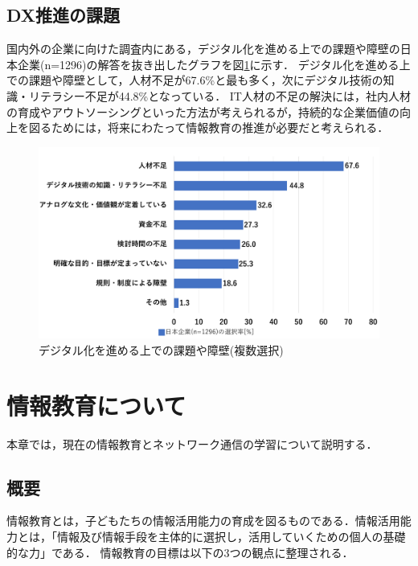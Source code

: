 \documentclass[12pt,a4j,titlepage]{ltjsarticle}
\begin{document}
\subsection{DX推進の課題}
国内外の企業に向けた調査内にある，デジタル化を進める上での課題や障壁の日本企業(n=1296)の解答を抜き出したグラフを図\ref{fig:dx}に示す\cite{dx_kadai}．
デジタル化を進める上での課題や障壁として，人材不足が67.6\%と最も多く，次にデジタル技術の知識・リテラシー不足が44.8\%となっている．
IT人材の不足の解決には，社内人材の育成やアウトソーシングといった方法が考えられるが，持続的な企業価値の向上を図るためには，将来にわたって情報教育の推進が必要だと考えられる．
\\
\begin{figure}[h]
\centering
\includegraphics[clip,width=150mm]{figures/dx.pdf}
\caption[デジタル化を進める上での課題や障壁]{デジタル化を進める上での課題や障壁(複数選択)\linebreak}
\label{fig:dx}
\end{figure}

\clearpage

\section{情報教育について}%
本章では，現在の情報教育とネットワーク通信の学習について説明する．
\subsection{概要}
情報教育とは，子どもたちの情報活用能力の育成を図るものである．情報活用能力とは，「情報及び情報手段を主体的に選択し，活用していくための個人の基礎的な力」である．
情報教育の目標は以下の3つの観点に整理される\cite{kyoiku_gaiyou}．
\end{document}
